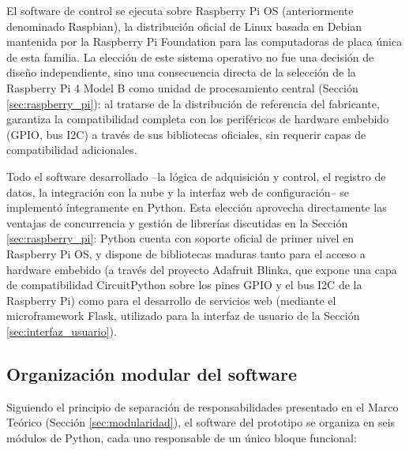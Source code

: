 El software de control se ejecuta sobre Raspberry Pi OS (anteriormente denominado Raspbian), la distribución oficial de Linux basada en Debian mantenida por la Raspberry Pi Foundation para las computadoras de placa única de esta familia. La elección de este sistema operativo no fue una decisión de diseño independiente, sino una consecuencia directa de la selección de la Raspberry Pi 4 Model B como unidad de procesamiento central (Sección \ref{sec:raspberry_pi}): al tratarse de la distribución de referencia del fabricante, garantiza la compatibilidad completa con los periféricos de hardware embebido (GPIO, bus I2C) a través de sus bibliotecas oficiales, sin requerir capas de compatibilidad adicionales.

Todo el software desarrollado --la lógica de adquisición y control, el registro de datos, la integración con la nube y la interfaz web de configuración-- se implementó íntegramente en Python. Esta elección aprovecha directamente las ventajas de concurrencia y gestión de librerías discutidas en la Sección \ref{sec:raspberry_pi}: Python cuenta con soporte oficial de primer nivel en Raspberry Pi OS, y dispone de bibliotecas maduras tanto para el acceso a hardware embebido (a través del proyecto Adafruit Blinka, que expone una capa de compatibilidad CircuitPython sobre los pines GPIO y el bus I2C de la Raspberry Pi) como para el desarrollo de servicios web (mediante el microframework Flask, utilizado para la interfaz de usuario de la Sección \ref{sec:interfaz_usuario}).

\subsection{Organización modular del software}
\label{subsec:organizacion_modular_real}

Siguiendo el principio de separación de responsabilidades presentado en el Marco Teórico (Sección \ref{sec:modularidad}), el software del prototipo se organiza en seis módulos de Python, cada uno responsable de un único bloque funcional:

